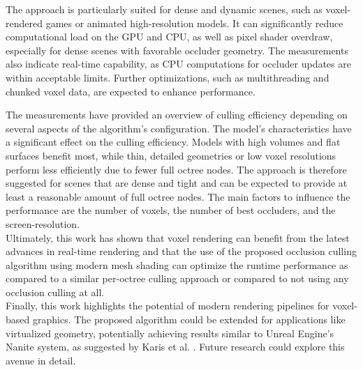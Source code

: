 \clearpage

\noindent
The approach is particularly suited for dense and dynamic scenes, such as voxel-rendered 
games or animated high-resolution models. It can significantly reduce computational load 
on the \ac{GPU} and \ac{CPU}, as well as pixel shader overdraw, especially for dense scenes with 
favorable occluder geometry. The measurements also indicate real-time capability, as 
\ac{CPU} computations for occluder updates are within acceptable limits. Further 
optimizations, such as multithreading and chunked voxel data, are expected to enhance 
performance.


\noindent
The measurements have provided an overview of culling efficiency depending on several 
aspects of the algorithm's configuration. The model's characteristics have a significant 
effect on the culling efficiency. Models with high volumes and flat surfaces benefit most, 
while thin, detailed geometries or low voxel resolutions perform less efficiently due 
to fewer full octree nodes. The approach is therefore suggested for scenes that are dense 
and tight and can be expected to provide at least a reasonable amount of full octree nodes. 
The main factors to influence the performance are the number of voxels, the number of 
best occluders, and the screen-resolution.\\

\noindent
Ultimately, this work has shown that voxel rendering can benefit from the latest advances 
in real-time rendering and that the use of the proposed occlusion culling algorithm 
using modern mesh shading can optimize the runtime performance as compared to a similar 
per-octree culling approach or compared to not using any occlusion culling at all. \\

\noindent
Finally, this work highlights the potential of modern rendering pipelines for voxel-based 
graphics. The proposed algorithm could be extended for applications like virtualized 
geometry, potentially achieving results similar to Unreal Engine's Nanite system, as 
suggested by Karis et al. \cite{Karis2021}. Future research could explore this avenue 
in detail.
